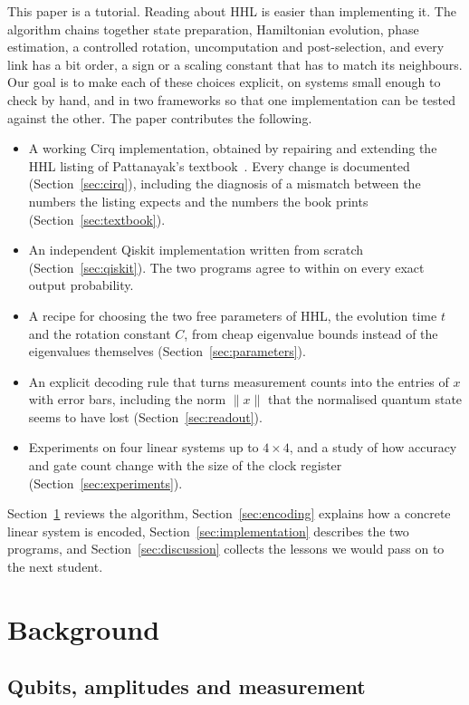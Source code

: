 \documentclass[manuscript,screen,review,nonacm]{acmart}
\newcommand{\norm}[1]{\lVert #1\rVert}
\begin{document}
This paper is a tutorial. Reading about HHL is easier than implementing it.
The algorithm chains together state preparation, Hamiltonian evolution, phase
estimation, a controlled rotation, uncomputation and post-selection, and every
link has a bit order, a sign or a scaling constant that has to match its
neighbours. Our goal is to make each of these choices explicit, on systems
small enough to check by hand, and in two frameworks so that one
implementation can be tested against the other. The paper contributes the
following.
\begin{itemize}
\item A working Cirq implementation, obtained by repairing and extending the
  HHL listing of Pattanayak's textbook~\cite{pattanayak2021}. Every change is
  documented (Section~\ref{sec:cirq}), including the diagnosis of a mismatch
  between the numbers the listing expects and the numbers the book prints
  (Section~\ref{sec:textbook}).
\item An independent Qiskit implementation written from scratch
  (Section~\ref{sec:qiskit}). The two programs agree to within
  \FrameworkDifference{} on every exact output probability.
\item A recipe for choosing the two free parameters of HHL, the evolution
  time $t$ and the rotation constant $C$, from cheap eigenvalue bounds instead
  of the eigenvalues themselves (Section~\ref{sec:parameters}).
\item An explicit decoding rule that turns measurement counts into the
  entries of $x$ with error bars, including the norm $\norm{x}$ that the
  normalised quantum state seems to have lost (Section~\ref{sec:readout}).
\item Experiments on four linear systems up to $4\times 4$, and a study of
  how accuracy and gate count change with the size of the clock register
  (Section~\ref{sec:experiments}).
\end{itemize}
Section~\ref{sec:background} reviews the algorithm, Section~\ref{sec:encoding}
explains how a concrete linear system is encoded, Section~\ref{sec:implementation}
describes the two programs, and Section~\ref{sec:discussion} collects the
lessons we would pass on to the next student.

\section{Background}
\label{sec:background}

\subsection{Qubits, amplitudes and measurement}
\end{document}

